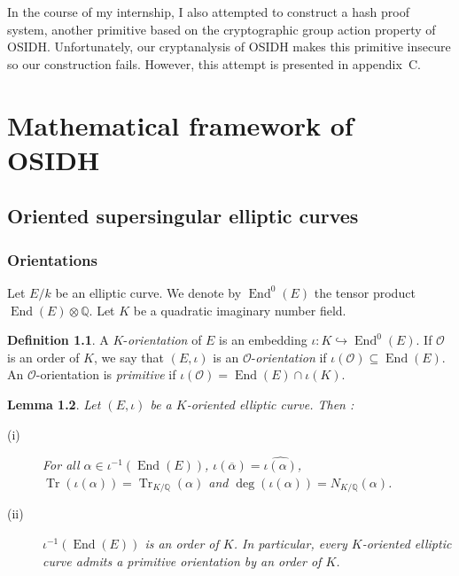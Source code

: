 \documentclass[a4paper,10pt]{report}
\theoremstyle{definition}
\newtheorem{definition}{Definition}[chapter]
\theoremstyle{plain}
\newtheorem{lemma}[definition]{Lemma}
\theoremstyle{definition}
\newcommand{\Q}{\mathbb{Q}}
\newcommand{\mO}{\mathcal{O}}
\renewcommand{\(}{\left(}
\renewcommand{\)}{\right)}
\DeclareMathOperator{\End}{End}
\DeclareMathOperator{\Tr}{Tr}
\begin{document}
In the course of my internship, I also attempted to construct a hash proof system, another primitive based on the cryptographic group action property of OSIDH. Unfortunately, our cryptanalysis of OSIDH makes this primitive insecure so our construction fails. However, this attempt is presented in appendix~C.

\chapter{Mathematical framework of OSIDH}

\section{Oriented supersingular elliptic curves}

\subsection{Orientations}

Let $E/k$ be an elliptic curve.  We denote by $\End^0(E)$ the tensor product $\End(E)\otimes \Q$.  Let $K$ be a quadratic imaginary number field.

\begin{definition}
A $K$-\emph{orientation} of $E$ is an embedding $\iota : K\hookrightarrow \End^0(E)$.  If $\mO$ is an order of $K$,  we say that $(E, \iota)$ is an $\mO$-\emph{orientation} if $\iota(\mO)\subseteq \End(E)$.  An $\mO$-orientation is \emph{primitive} if $\iota(\mO)=\End(E)\cap\iota(K)$.
\end{definition}

\begin{lemma}
Let $(E,\iota)$ be a $K$-oriented elliptic curve.  Then :
\begin{description}
\item[(i)] For all $\alpha\in\iota^{-1}(\End(E))$,  $\iota(\overline{\alpha})=\widehat{\iota(\alpha)}$,  $\Tr(\iota(\alpha))=\Tr_{K/\Q}(\alpha)$ and $\deg(\iota(\alpha))=N_{K/\Q}(\alpha)$.
\item[(ii)] $\iota^{-1}(\End(E))$ is an order of $K$.  In particular,  every $K$-oriented elliptic curve admits a primitive orientation by an order of $K$.
\end{description}
\end{lemma}
\end{document}

